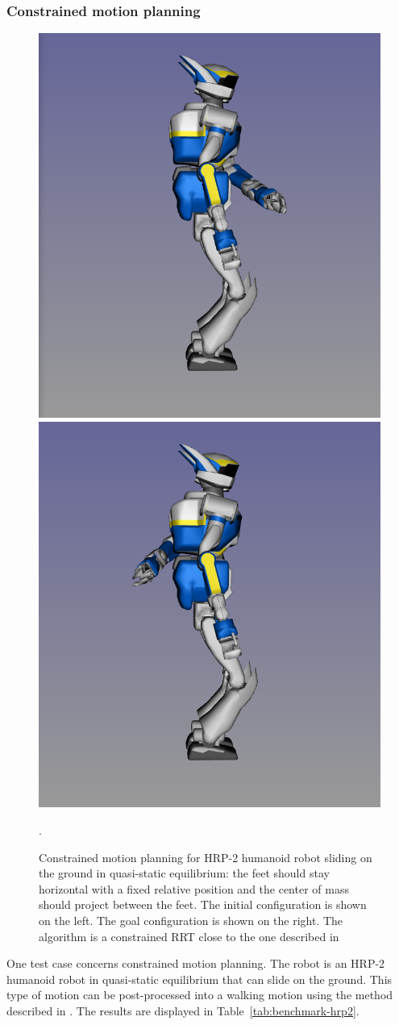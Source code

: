 \subsubsection{Constrained motion planning}

\begin{figure}
  \begin{center}
    \includegraphics[width=.49\linewidth]{figures/hrp2-q-init.png}
    \includegraphics[width=.49\linewidth]{figures/hrp2-q-goal.png}
  \end{center}
  \caption{Constrained motion planning for HRP-2 humanoid robot sliding on the ground in quasi-static equilibrium: the feet should stay horizontal with a fixed relative position and the center of mass should project between the feet. The initial configuration is shown on the left. The goal configuration is shown on the right. The algorithm is a constrained RRT close to the one described in~\cite{DalNakLamLau2009}}.
  \label{fig:benchmark-hrp2}
\end{figure}
One test case concerns constrained motion planning. The robot is an HRP-2 humanoid robot in quasi-static equilibrium that can slide on the ground. This type of motion can be post-processed into a walking motion using the method described in \cite{dalibard:hal-00654175}. The results are displayed in Table~\ref{tab:benchmark-hrp2}.

